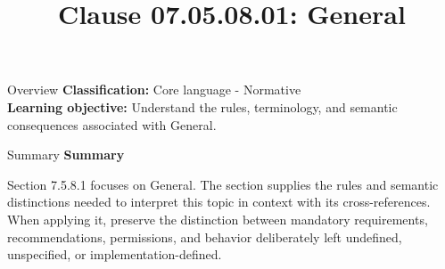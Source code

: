 \documentclass[10pt,letterpaper]{article}
\title{Clause 07.05.08.01: General}
\author{}
\date{}
\begin{document}
\maketitle
\begin{CornellOverviewBox}{Overview}
\textbf{Classification:} Core language - Normative\\[2pt]
\textbf{Learning objective:} Understand the rules, terminology, and semantic consequences associated with General.
\end{CornellOverviewBox}\begin{CornellSummaryBox}{Summary}
{\sffamily\bfseries\color{Accent} Summary}\par\vspace{3pt}Section 7.5.8.1 focuses on General. The section supplies the rules and semantic distinctions needed to interpret this topic in context with its cross-references. When applying it, preserve the distinction between mandatory requirements, recommendations, permissions, and behavior deliberately left undefined, unspecified, or implementation-defined.
\end{CornellSummaryBox}
\end{document}

